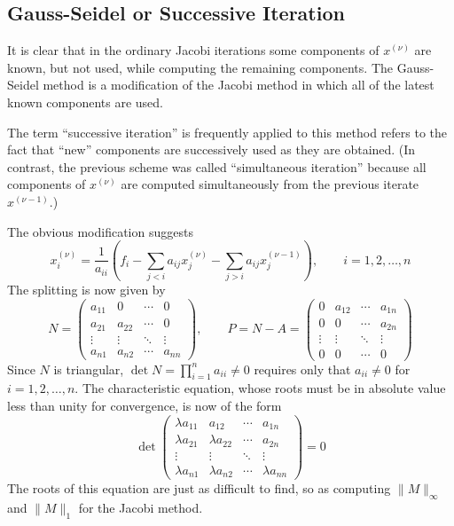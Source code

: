 \documentclass[../main.tex]{subfiles}
\begin{document}
\subsection{Gauss-Seidel or Successive Iteration}
It is clear that in the ordinary Jacobi iterations some components of $x^{(\nu)}$ are known, but not used, while computing the remaining components. The Gauss-Seidel method is a modification of the Jacobi method in which all of the latest known components are used.
\begin{remark}
	The term ``successive iteration'' is frequently applied to this method refers to the fact that ``new'' components are successively used as they are obtained. (In contrast, the previous scheme was called ``simultaneous iteration'' because all components of $x^{(\nu)}$ are computed simultaneously from the previous iterate $x^{(\nu-1)}$.)
\end{remark}
The obvious modification suggests
\begin{equation}
	x_i^{(\nu)} = \frac{1}{a_{ii}} \left( f_i - \sum_{j < i} a_{ij} x_j^{(\nu)} - \sum_{j > i} a_{ij} x_j^{(\nu-1)} \right), \qquad i = 1, 2, \ldots, n
\end{equation}
The splitting is now given by
\begin{equation}
	N = \begin{pmatrix}
		a_{11} & 0      & \cdots & 0      \\
		a_{21} & a_{22} & \cdots & 0      \\
		\vdots & \vdots & \ddots & \vdots \\
		a_{n1} & a_{n2} & \cdots & a_{nn}
	\end{pmatrix}, \qquad P = N - A = \begin{pmatrix}
		0      & a_{12} & \cdots & a_{1n} \\
		0      & 0      & \cdots & a_{2n} \\
		\vdots & \vdots & \ddots & \vdots \\
		0      & 0      & \cdots & 0
	\end{pmatrix}
\end{equation}
Since $N$ is triangular, $\det N = \prod_{i=1}^n a_{ii} \neq 0$ requires only that $a_{ii} \neq 0$ for $i = 1, 2, \ldots, n$. The characteristic equation, whose roots must be in absolute value less than unity for convergence, is now of the form
\begin{equation*}
	\det
	\begin{pmatrix}
		\lambda a_{11} & a_{12}         & \cdots & a_{1n}         \\
		\lambda a_{21} & \lambda a_{22} & \cdots & a_{2n}         \\
		\vdots         & \vdots         & \ddots & \vdots         \\
		\lambda a_{n1} & \lambda a_{n2} & \cdots & \lambda a_{nn}
	\end{pmatrix} = 0
\end{equation*}
The roots of this equation are just as difficult to find, so as computing $\| M \|_{\infty}$ and $\| M \|_1$ for the Jacobi method.
\end{document}
